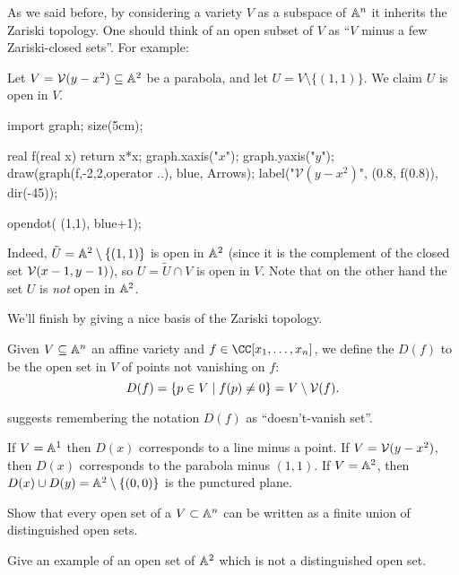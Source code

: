 As we said before, by considering a variety $V$ as a subspace of $\mathbb A^n$
it inherits the Zariski topology.
One should think of an open subset of $V$ as ``$V$ minus a few Zariski-closed sets''.
For example:
\begin{example}
	Let $V = \mathcal V(y-x^2) \subseteq \mathbb A^2$ be a parabola,
	and let $U = V \setminus \{(1,1)\}$. We claim $U$ is open in $V$.
	\begin{center}
		\begin{asy}
		import graph;
		size(5cm);

		real f(real x) { return x*x; }
		graph.xaxis("$x$");
		graph.yaxis("$y$");
		draw(graph(f,-2,2,operator ..), blue, Arrows);
		label("$\mathcal V(y-x^2)$", (0.8, f(0.8)), dir(-45));

		opendot( (1,1), blue+1);
		\end{asy}
	\end{center}
	Indeed, $\tilde U = \mathbb A^2 \setminus \{(1,1)\}$ is open in $\mathbb A^2$
	(since it is the complement of the closed set $\mathcal V(x-1,y-1)$),
	so $U = \tilde U \cap V$ is open in $V$.
	Note that on the other hand the set $U$ is \emph{not} open in $\mathbb A^2$.
\end{example}

We'll finish by giving a nice basis of the Zariski topology.
\begin{definition}
	Given $V \subseteq \mathbb A^n$ an affine variety and $f \in \CC[x_1, \dots, x_n]$,
	we define the  $D(f)$ to be the open set in $V$
	of points not vanishing on $f$:
	\[ D(f) = \left\{ p \in V \mid f(p) \neq 0 \right\} = V \setminus \mathcal V(f). \]
\end{definition}
\cite{ref:vakil} suggests remembering the notation $D(f)$ as ``doesn't-vanish set''.
\begin{example}
	\listhack
	\begin{enumerate}[(a)]
		\ii If $V = \mathbb A^1$ then $D(x)$ corresponds to a line minus a point.
		\ii If $V = \mathcal V(y-x^2)$, then $D(x)$ corresponds to the parabola minus $(1,1)$.
		\ii If $V = \mathbb A^2$, then $D(x) \cup D(y) = \mathbb A^2 \setminus \{ (0,0) \}$ is the punctured plane.
	\end{enumerate}
\end{example}
\begin{ques}
	Show that every open set of a $V \subset \mathbb A^n$
	can be written as a finite union of distinguished open sets.
\end{ques}
\begin{exercise}
	Give an example of an open set of $\mathbb A^2$ which is not a distinguished open set.
\end{exercise}

